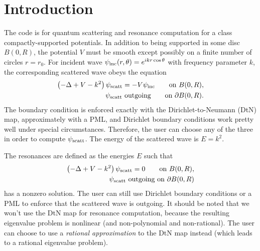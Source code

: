 \section{Introduction}
\label{sec-intro}

The code is for quantum scattering and resonance computation
for a class compactly-supported potentials.
In addition to being supported
in some disc $B(0,R)$, the potential $V$ must be smooth except possibly
on a finite number of circles $r = r_0$. For 
incident wave $\psi_{\text{inc}}(r,\theta) = e^{ikr\cos\theta}$ with frequency
parameter $k$, the corresponding scattered wave obeys the equation
\begin{equation}\label{eqtn-scattprob}
\begin{aligned}
 \left(-\Delta + V - k^2\right)\psi_{\text{scatt}} = -V\psi_{\text{inc}}
 \qquad
 \text{on }B(0,R), \\ 
 \text{$\psi_{\text{scatt}}$ outgoing}
 \qquad
 \text{on }\partial B(0,R).
\end{aligned}
\end{equation}
The boundary condition is enforced exactly with the Dirichlet-to-Neumann
(DtN)
map, approximately with a PML, and Dirichlet boundary conditions
work pretty well under special circumstances. Therefore, the user
can choose any of the three in order to compute $\psi_{\text{scatt}}$.
The energy of the scattered wave is $E = k^2$.

The resonances are defined as the energies $E$ such that
\begin{equation}\label{eqtn-resprob}
\begin{aligned}
 \left(-\Delta + V - k^2\right)\psi_{\text{scatt}} = 0
 \qquad
 \text{on }B(0,R), \\
 \text{$\psi_{\text{scatt}}$ outgoing on }\partial B(0,R)
\end{aligned}
\end{equation}
has a nonzero solution. The user can still use Dirichlet boundary conditions
or a PML to enforce that the scattered wave is outgoing. 
It should be noted that we won't use the
DtN map for resonance computation, because the 
resulting eigenvalue problem is nonlinear (and non-polynomial and
non-rational). The user can choose to use a {\it rational approximation}
to the DtN map instead (which leads to a rational eigenvalue problem).


